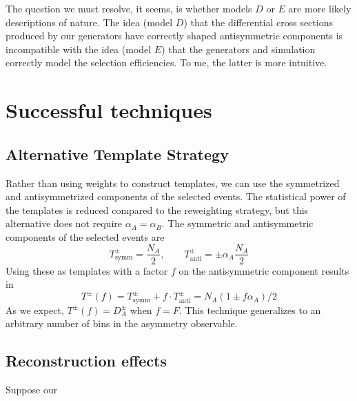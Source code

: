 \documentclass[letterpaper,11pt]{article}
\begin{document}
The question we must resolve, it seems, is whether models $D$ or $E$
are more likely descriptions of nature.  The idea (model $D$) that the
differential cross sections produced by our generators have correctly
shaped antisymmetric components is incompatible with the idea (model
$E$) that the generators and simulation correctly model the selection
efficiencies.  To me, the latter is more intuitive.

\section{Successful techniques}

\subsection{Alternative Template Strategy}

Rather than using weights to construct templates, we can use the
symmetrized and antisymmetrized components of the selected events.
The statistical power of the templates is reduced compared to the
reweighting strategy, but this alternative does not require
$\alpha_A=\alpha_B$.  The symmetric and antisymmetric components of
the selected events are
\[T^\pm_{\mathrm{symm}} = \frac{N_A}{2}, \qquad T^\pm_{\mathrm{anti}} = \pm\alpha_A\frac{N_A}{2}\]
Using these as templates with a factor $f$ on the antisymmetric
component results in
\[T^\pm(f) = T^\pm_{\mathrm{symm}} + f\cdot T^\pm_{\mathrm{anti}} = N_A(1\pm f\alpha_A)/2\]
As we expect, $T^\pm(f)=D^\pm_A$ when $f=F$.  This technique
generalizes to an arbitrary number of bins in the asymmetry
observable.

\subsection{Reconstruction effects}

Suppose our 
\end{document}

